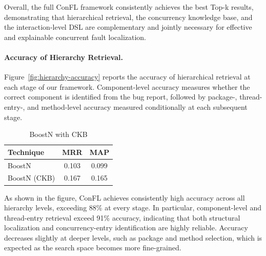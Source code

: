 Overall, the full ConFL framework consistently achieves the best Top-k results, demonstrating that hierarchical retrieval, the concurrency knowledge base, and the interaction-level DSL are complementary and jointly necessary for effective and explainable concurrent fault localization.




\paragraph{Accuracy of Hierarchy Retrieval.}
Figure~\ref{fig:hierarchy-accuracy} reports the accuracy of hierarchical retrieval at each stage of our framework.
Component-level accuracy measures whether the correct component is identified from the bug report, followed by package-, thread-entry-, and method-level accuracy measured conditionally at each subsequent stage.

\begin{table} \footnotesize
\vspace{-10pt}
\centering 
\caption{BoostN with CKB} \label{tab:boost}
\begin{tabular}{lcc}
\toprule
Technique & MRR & MAP \\
\midrule
BoostN &  0.103  & 0.099 \\
BoostN (CKB) &  0.167   &  0.165 \\
\bottomrule
\end{tabular}
\vspace{-10pt}
\end{table}

As shown in the figure, ConFL achieves consistently high accuracy across all hierarchy levels, exceeding 88\% at every stage.
In particular, component-level and thread-entry retrieval exceed 91\% accuracy, indicating that both structural localization and concurrency-entry identification are highly reliable.
Accuracy decreases slightly at deeper levels, such as package and method selection, which is expected as the search space becomes more fine-grained.



